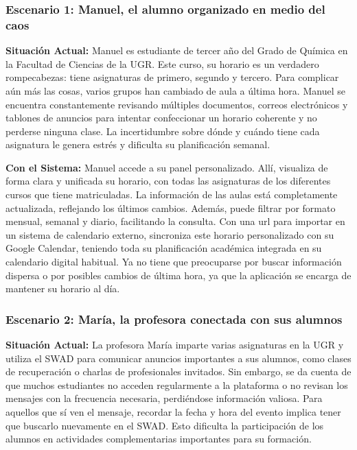 \subsubsection*{Escenario 1: Manuel, el alumno organizado en medio del caos}

\textbf{Situación Actual:} Manuel es estudiante de tercer año del Grado de Química en la Facultad de Ciencias de la UGR. Este curso, su horario es un verdadero rompecabezas: tiene asignaturas de primero, segundo y tercero. Para complicar aún más las cosas, varios grupos han cambiado de aula a última hora. Manuel se encuentra constantemente revisando múltiples documentos, correos electrónicos y tablones de anuncios para intentar confeccionar un horario coherente y no perderse ninguna clase. La incertidumbre sobre dónde y cuándo tiene cada asignatura le genera estrés y dificulta su planificación semanal.

\textbf{Con el Sistema:} Manuel accede a su panel personalizado. Allí, visualiza de forma clara y unificada su horario, con todas las asignaturas de los diferentes cursos que tiene matriculadas. La información de las aulas está completamente actualizada, reflejando los últimos cambios. Además, puede filtrar por formato mensual, semanal y diario, facilitando la consulta. Con una url para importar en un sistema de calendario externo, sincroniza este horario personalizado con su Google Calendar, teniendo toda su planificación académica integrada en su calendario digital habitual. Ya no tiene que preocuparse por buscar información dispersa o por posibles cambios de última hora, ya que la aplicación se encarga de mantener su horario al día.

\subsubsection*{Escenario 2: María, la profesora conectada con sus alumnos}

\textbf{Situación Actual:} La profesora María imparte varias asignaturas en la UGR y utiliza el SWAD para comunicar anuncios importantes a sus alumnos, como clases de recuperación o charlas de profesionales invitados. Sin embargo, se da cuenta de que muchos estudiantes no acceden regularmente a la plataforma o no revisan los mensajes con la frecuencia necesaria, perdiéndose información valiosa. Para aquellos que sí ven el mensaje, recordar la fecha y hora del evento implica tener que buscarlo nuevamente en el SWAD. Esto dificulta la participación de los alumnos en actividades complementarias importantes para su formación.


